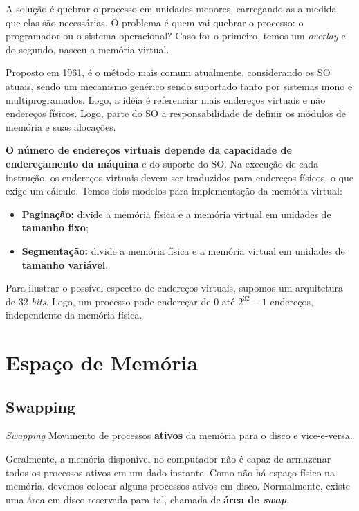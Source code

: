 A solução é quebrar o processo em unidades menores, carregando-as a medida que elas são necessárias. O problema é quem vai quebrar o processo: o programador ou o sistema operacional? Caso for o primeiro, temos um \textit{overlay} e do segundo, nasceu a memória virtual.

Proposto em 1961, é o método mais comum atualmente, considerando os SO atuais, sendo um mecanismo genérico sendo suportado tanto por sistemas mono e multiprogramados. Logo, a idéia é referenciar mais endereços virtuais e não endereços físicos. Logo, parte do SO a responsabilidade de definir os módulos de memória e suas alocações.

\textbf{O número de endereços virtuais depende da capacidade de endereçamento da máquina} e do suporte do SO. Na execução de cada instrução, os endereços virtuais devem ser traduzidos para endereços físicos, o que exige um cálculo. Temos dois modelos para implementação da memória virtual:

\begin{itemize}
  \item \textbf{Paginação:} divide a memória física e a memória virtual em unidades de \textbf{tamanho fixo};

  \item \textbf{Segmentação:} divide a memória física e a memória virtual em unidades de \textbf{tamanho variável}.
\end{itemize}

Para ilustrar o possível espectro de endereços virtuais, supomos um arquitetura de 32 \textit{bits}. Logo, um processo pode endereçar de 0 até $2^{32} - 1$ endereços, independente da memória física.





\section{Espaço de Memória}

\subsection{Swapping}
\begin{definicao}{\textit{Swapping}}
  Movimento de processos \textbf{ativos} da memória para o disco e vice-e-versa.
\end{definicao}

Geralmente, a memória disponível no computador não é capaz de armazenar todos os processos ativos em um dado instante. Como não há espaço físico na memória, devemos colocar alguns processos ativos em disco. Normalmente, existe uma área em disco reservada para tal, chamada de \textbf{área de \textit{swap}}.

